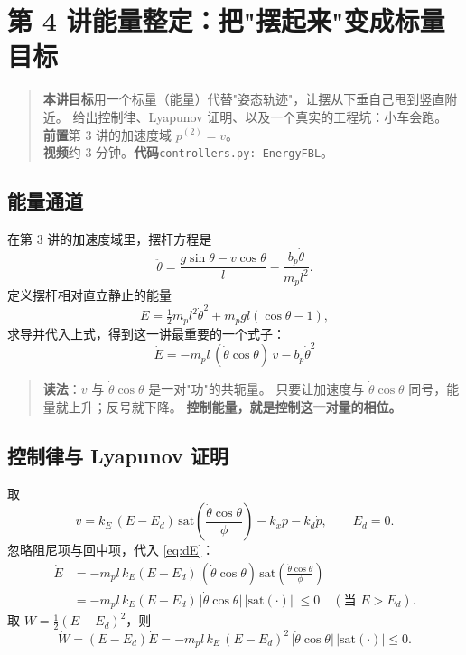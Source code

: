 \chapter[能量整定]{第 4 讲\quad 能量整定：把"摆起来"变成标量目标}
\label{ch:energy}

\begin{quote}\small
\textbf{本讲目标}\quad 用一个标量（能量）代替"姿态轨迹"，让摆从下垂自己甩到竖直附近。
给出控制律、Lyapunov 证明、以及一个真实的工程坑：小车会跑。\\[2pt]
\textbf{前置}\quad 第 3 讲的加速度域 $p^{(2)}=v$。\\
\textbf{视频}\quad 约 3 分钟。\quad\textbf{代码}\quad \texttt{controllers.py: EnergyFBL}。
\end{quote}

\section{能量通道}

在第 3 讲的加速度域里，摆杆方程是
\begin{equation}
  \ddot\theta=\frac{g\sin\theta-v\cos\theta}{l}-\frac{b_p\dot\theta}{m_p l^2}.
\end{equation}
定义摆杆相对直立静止的能量
\begin{equation}
  E=\tfrac12 m_p l^2\dot\theta^2+m_p g l(\cos\theta-1),
  \label{eq:E}
\end{equation}
求导并代入上式，得到这一讲最重要的一个式子：
\begin{equation}
  \boxed{\;\dot E=-m_p l\,(\dot\theta\cos\theta)\,v-b_p\dot\theta^2\;}
  \label{eq:dE}
\end{equation}

\begin{quote}
\textbf{读法}：$v$ 与 $\dot\theta\cos\theta$ 是一对"功"的共轭量。
只要让加速度与 $\dot\theta\cos\theta$ 同号，能量就上升；反号就下降。
\textbf{控制能量，就是控制这一对量的相位。}
\end{quote}

\section{控制律与 Lyapunov 证明}

取
\begin{equation}
  v=k_E\,(E-E_d)\,\mathrm{sat}\!\left(\frac{\dot\theta\cos\theta}{\phi}\right)
   -k_x p-k_d\dot p,\qquad E_d=0 .
  \label{eq:law}
\end{equation}
忽略阻尼项与回中项，代入 \eqref{eq:dE}：
\begin{align}
  \dot E &= -m_p l\,k_E (E-E_d)\,(\dot\theta\cos\theta)\,
            \mathrm{sat}\!\left(\frac{\dot\theta\cos\theta}{\phi}\right)\\
         &= -m_p l\,k_E (E-E_d)\,\big|\dot\theta\cos\theta\big|\,
            \Big|\mathrm{sat}(\cdot)\Big| \;\le 0 \quad(\text{当 } E>E_d).
\end{align}
取 $W=\tfrac12(E-E_d)^2$，则
\begin{equation}
  \dot W=(E-E_d)\dot E
  =-m_p l\,k_E\,(E-E_d)^2\,\big|\dot\theta\cos\theta\big|\,\big|\mathrm{sat}(\cdot)\big|\le0 .
\end{equation}

